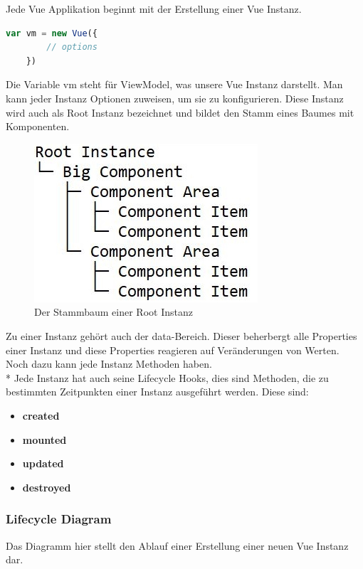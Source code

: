 Jede Vue Applikation beginnt mit der Erstellung einer Vue Instanz.

\begin{lstlisting}[language=JavaScript,caption=Vue Instanz,label=lst:impl:foo]
    var vm = new Vue({
        // options
    }) 
\end{lstlisting}

Die Variable vm steht für ViewModel, was unsere Vue Instanz darstellt. Man kann jeder Instanz Optionen zuweisen, um sie zu konfigurieren.
Diese Instanz wird auch als Root Instanz bezeichnet und bildet den Stamm eines Baumes mit Komponenten. 

\begin{figure}[htp]
    \centering
    \includegraphics[scale=1]{pics/RootComponentTree.JPG}
    \caption{Der Stammbaum einer Root Instanz}
    \label{fig:impl:RootComponentTree}
\end{figure}
Zu einer Instanz gehört auch der data-Bereich. Dieser beherbergt alle Properties einer
Instanz und diese Properties reagieren auf Veränderungen von Werten. Noch dazu kann jede Instanz Methoden haben. \\*
Jede Instanz hat auch seine Lifecycle Hooks, dies sind Methoden, die zu bestimmten Zeitpunkten einer Instanz ausgeführt werden. \cite{VueGuideInstance}
Diese sind:
\begin{itemize}
    \item \textbf{created}
    \item \textbf{mounted}          
    \item \textbf{updated} 
    \item \textbf{destroyed} 
\end{itemize}
\clearpage

\subsubsection{Lifecycle Diagram}
Das Diagramm hier stellt den Ablauf einer Erstellung einer neuen Vue Instanz dar.

